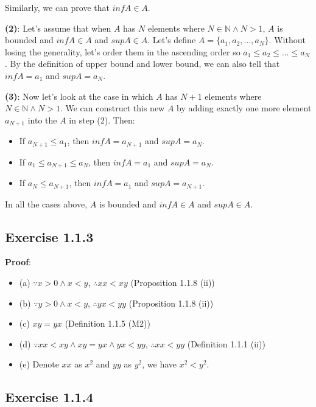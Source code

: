 \documentclass[12pt, letterpaper, oneside]{book}
\begin{document}
Similarly, we can prove that $inf A \in A$.

\textbf{(2)}: Let's assume that when $A$ has $N$ elements where $N \in \mathbb{N} \land N > 1$, $A$ is bounded and
$inf A \in A$ and $sup A \in A$. Let's define $A = \{ a_1, a_2, \ldots, a_N \}$. Without losing the generality, let's
order them in the ascending order so $a_1 \le a_2 \le \ldots \le a_N$. By the definition of upper bound and lower bound,
we can also tell that $inf A = a_1$ and $sup A = a_N$.

\textbf{(3)}: Now let's look at the case in which $A$ has $N+1$ elements where $N \in \mathbb{N} \land N > 1$. We can
construct this new $A$ by adding exactly one more element $a_{N+1}$ into the $A$ in step (2). Then:
\begin{itemize}
  \item If $a_{N+1} \le a_1$, then $inf A = a_{N+1}$ and $sup A = a_N$.
  \item If $a_1 \le a_{N+1} \le a_N$, then $inf A = a_1$ and $sup A = a_N$.
  \item If $a_N \le a_{N+1}$, then $inf A = a_1$ and $sup A = a_{N+1}$.
\end{itemize}

In all the cases above, $A$ is bounded and $inf A \in A$ and $sup A \in A$.

\subsection{Exercise 1.1.3}

\textbf{Proof}:
\begin{itemize}
  \item (a) $\because x > 0 \land x < y$, $\therefore xx < xy$ (Proposition 1.1.8 (ii))
  \item (b) $\because y > 0 \land x < y$, $\therefore yx < yy$ (Proposition 1.1.8 (ii))
  \item (c) $xy = yx$ (Definition 1.1.5 (M2))
  \item (d) $\because xx < xy \land xy = yx \land yx < yy$, $\therefore xx < yy$ (Definition 1.1.1 (ii))
  \item (e) Denote $xx$ as $x^2$ and $yy$ as $y^2$, we have $x^2 < y^2$.
\end{itemize}

\subsection{Exercise 1.1.4}
\end{document}
